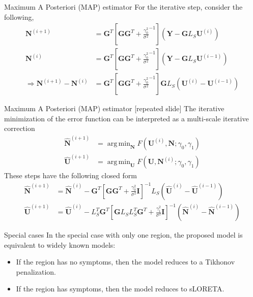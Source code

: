 \documentclass[progressbar=head]{beamer}
\newcommand{\ppar}[1]{ \left( #1 \right) }
\newcommand{\spar}[1]{ \left[ #1 \right] }
\DeclareMathOperator*{\argmin}{arg\,min}
\newcommand{\Y}{\mathbf{Y}}
\newcommand{\G}{\mathbf{G}}
\newcommand{\U}{\mathbf{U}}
\newcommand{\N}{\mathbf{N}}
\newcommand{\id}{\mathbf{I}}
\begin{document}
\begin{frame}{Maximum A Posteriori (MAP) estimator}
For the iterative step, consider the following,
\begin{align*}
\N^{(i+1)} &=
\G^T \spar{\G \G^T+ \frac{\gamma_0^2}{\sigma^2}^{-1}} \ppar{\Y - \G L_S \U^{(i)} }
\\
\N^{(i)} &=
\G^T \spar{\G \G^T+ \frac{\gamma_0^2}{\sigma^2}^{-1}} \ppar{\Y - \G L_S \U^{(i-1)} }
\\
\Rightarrow
\N^{(i+1)}-\N^{(i)} &=
\G^T \spar{\G \G^T+ \frac{\gamma_0^2}{\sigma^2}^{-1}} \G L_S \ppar{ \U^{(i)}-\U^{(i-1)} }
\end{align*}
\end{frame}

\begin{frame}{Maximum A Posteriori (MAP) estimator [repeated slide]}
    The iterative minimization of the error function can be interpreted as a multi-scale iterative correction
    \begin{align}
        \hat{\N}^{(i+1)} &= \argmin_{\N} F\ppar{\U^{(i)},\N; \gamma_0, \gamma_1}
        \\
        \hat{\U}^{(i+1)} &= \argmin_{\U} F\ppar{\U,\N^{(i)}; \gamma_0, \gamma_1}
    \end{align}
    These steps have the following closed form
    \begin{align}
        \hat{\N}^{(i+1)} &=
        \hat{\N}^{(i)}
        -
        \G^T \spar{\G \G^T + \frac{\gamma_0^2}{\sigma^2} \id}^{-1} L_S \ppar{\hat{\U}^{(i)}-\hat{\U}^{(i-1)} }
        \\
        \hat{\U}^{(i+1)} &=
        \hat{\U}^{(i)}
        -
        L_S^T \G^T \spar{\G L_S L_S^T \G^T + \frac{\gamma_1^2}{\sigma^2} \id}^{-1} \ppar{\hat{\N}^{(i)}-\hat{\N}^{(i-1)} }
    \end{align}
\end{frame}

\begin{frame}{Special cases}
In the special case with only one region, the proposed model is equivalent to widely known models:
\begin{itemize}
\item If the region has no symptoms, 
then the model reduces to a Tikhonov penalization.
\item If the region has symptoms,
then the model reduces to sLORETA.
\end{itemize}
\end{frame}
\end{document}

